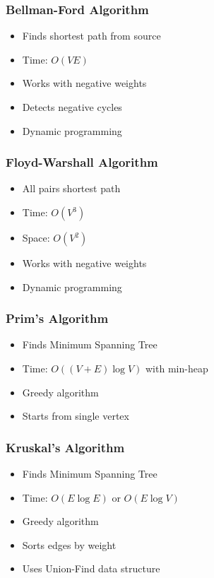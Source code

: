 \documentclass[11pt,a4paper]{article}
\begin{document}
\subsubsection{Bellman-Ford Algorithm}
\begin{itemize}
    \item Finds shortest path from source
    \item Time: $O(VE)$
    \item Works with negative weights
    \item Detects negative cycles
    \item Dynamic programming
\end{itemize}

\subsubsection{Floyd-Warshall Algorithm}
\begin{itemize}
    \item All pairs shortest path
    \item Time: $O(V^3)$
    \item Space: $O(V^2)$
    \item Works with negative weights
    \item Dynamic programming
\end{itemize}

\subsubsection{Prim's Algorithm}
\begin{itemize}
    \item Finds Minimum Spanning Tree
    \item Time: $O((V + E) \log V)$ with min-heap
    \item Greedy algorithm
    \item Starts from single vertex
\end{itemize}

\subsubsection{Kruskal's Algorithm}
\begin{itemize}
    \item Finds Minimum Spanning Tree
    \item Time: $O(E \log E)$ or $O(E \log V)$
    \item Greedy algorithm
    \item Sorts edges by weight
    \item Uses Union-Find data structure
\end{itemize}
\end{document}
